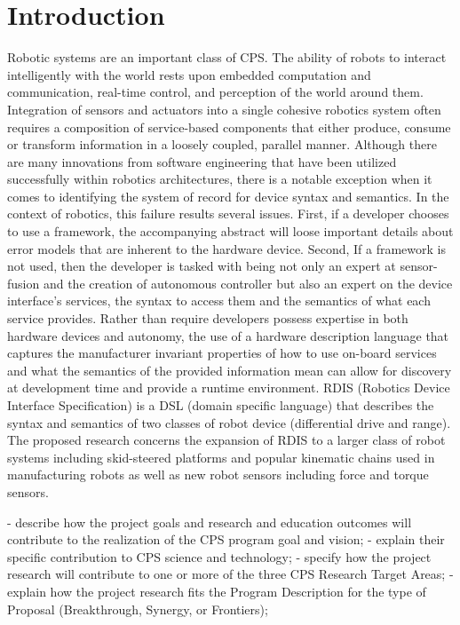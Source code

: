 \section{Introduction}
Robotic systems are an important class of CPS. The ability of robots to interact intelligently with the world rests upon embedded computation and communication, real-time control, and perception of the world around them. Integration of sensors and actuators into a single cohesive robotics system often requires a composition of service-based components that either produce, consume or transform information in a loosely coupled, parallel manner.
Although there are many innovations from software engineering that have been utilized successfully within robotics architectures, there is a notable exception when it comes to identifying the system of record for device syntax and semantics.  In the context of robotics, this failure results several issues.  First, if a developer chooses to use a framework, the accompanying abstract will loose important details about error models that are inherent to the hardware device.  Second, If a framework is not used, then the developer is tasked with being not only an expert at sensor-fusion and the creation of autonomous controller but also an expert on the device interface's services, the syntax to access them and the semantics of what each service provides.  Rather than require developers possess expertise in both hardware devices and autonomy, the use of a hardware description language that captures the manufacturer invariant properties of how to use on-board services and what the semantics of the provided information mean can allow for discovery at development time and provide a runtime environment.
RDIS (Robotics Device Interface Specification) is a DSL (domain specific language) that describes the syntax and semantics of two classes of robot device (differential drive and range).  The proposed research concerns the expansion of RDIS to a larger class of robot systems including skid-steered platforms and popular kinematic chains used in manufacturing robots as well as new robot sensors including force and torque sensors.

- describe how the project goals and research and education outcomes will contribute to the realization of the CPS program goal and vision;
- explain their specific contribution to CPS science and technology;
- specify how the project research will contribute to one or more of the three CPS Research Target Areas;
- explain how the project research fits the Program Description for the type of Proposal (Breakthrough, Synergy, or Frontiers);